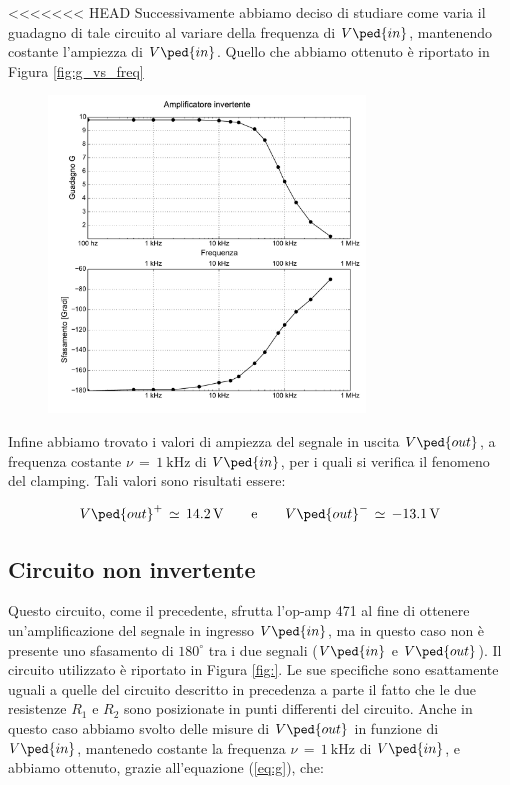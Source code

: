 <<<<<<< HEAD
Successivamente abbiamo deciso di studiare come varia il guadagno di tale circuito al variare della frequenza di $V\ped{in}$, mantenendo costante l'ampiezza di $V\ped{in}$. Quello che abbiamo ottenuto è riportato in Figura \ref{fig:g_vs_freq}

\begin{figure}
    \includegraphics[width=0.75\textwidth]{amp_inv.pdf}
\end{figure}

Infine abbiamo trovato i valori di ampiezza del segnale in uscita $V\ped{out}$, a frequenza costante $\nu\,=\,\SI{1}{\kilo\hertz}$ di $V\ped{in}$, per i quali si verifica il fenomeno del clamping. Tali valori sono risultati essere:

\begin{equation}
        V\ped{out}^+\,\simeq\,\SI{14.2}{\volt} \qquad \text{e} \qquad V\ped{out}^-\,\simeq\,\SI{-13.1}{\volt}
\end{equation}

\subsection*{Circuito non invertente}

Questo circuito, come il precedente, sfrutta l'op-amp 471 al fine di ottenere un'amplificazione del segnale in ingresso $V\ped{in}$, ma in questo caso non è presente uno sfasamento di $180^\circ$ tra i due segnali ($V\ped{in}$ e $V\ped{out}$).
Il circuito utilizzato è riportato in Figura \ref{fig:}. Le sue specifiche sono esattamente uguali a quelle del circuito descritto in precedenza a parte il fatto che le due resistenze $R_1$ e $R_2$ sono posizionate in punti differenti del circuito.
Anche in questo caso abbiamo svolto delle misure di $V\ped{out}$ in funzione di $V\ped{in}$, mantenedo costante la frequenza $\nu\,=\,\SI{1}{\kilo\hertz}$ di $V\ped{in}$, e abbiamo ottenuto, grazie all'equazione (\ref{eq:g}), che:

